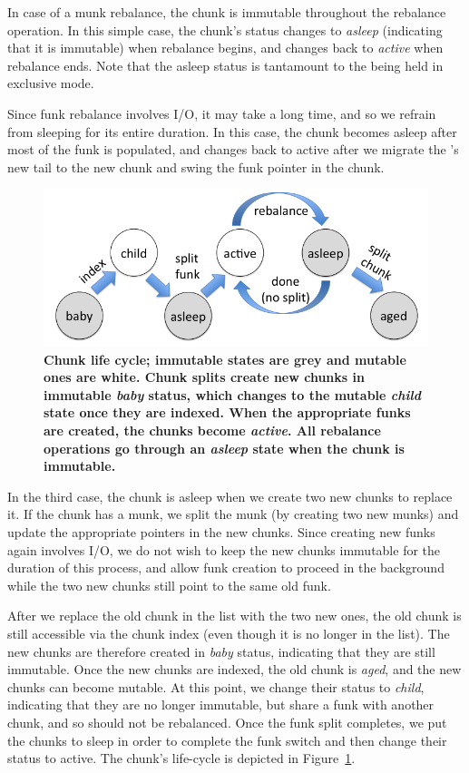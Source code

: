 In case of a munk rebalance, the chunk is immutable throughout the rebalance operation.
In this simple case, the chunk's status changes to \emph{asleep} (indicating that it is immutable)
when rebalance begins, and changes back to \emph{active} when rebalance ends. 
Note that the asleep status is tantamount to the  being held in exclusive mode.

Since funk rebalance involves I/O, it may take a long time, and so we  refrain from sleeping for its entire 
duration. In this case, the chunk becomes asleep after most of the funk is populated, and 
changes back to active after we 
migrate the 's new tail to the new chunk and swing the funk pointer in the chunk.


\begin{figure}[tb]
\centerline{
\includegraphics[width=\columnwidth]{state-diagram.png}
}
\caption{\bf{Chunk life cycle; immutable states are grey and mutable ones are white.
Chunk splits  create new chunks in immutable \emph{baby} status, which changes to the mutable \emph{child} state once they 
are indexed. When the appropriate funks are created, the chunks become \emph{active}. All rebalance operations go through an 
\emph{asleep} state when the chunk is immutable.}}
\label{fig:status}
\end{figure}

In the third case, the chunk is asleep when we create two new chunks to replace it. 
If the chunk has a munk, we split the munk (by creating two new munks) and update the appropriate pointers in the new chunks.  
Since creating new funks again involves I/O, we do not wish to keep the new chunks immutable for the duration of this process,
and allow funk creation to proceed in the background while the two new chunks still point to the same old funk. 

After we replace the old chunk in the list with the two new ones, 
the old chunk is still accessible via the chunk index (even though it is no longer in the list). 
The new chunks are therefore created in \emph{baby} status, indicating that they are still immutable. 
Once the new chunks are indexed, the old chunk is \emph{aged}, and the new chunks can become mutable.
At this point, we change their status to \emph{child}, indicating that they are no longer immutable, but share a funk with another chunk,
and so should not be rebalanced. Once the funk split completes, we put the chunks to sleep in order
to complete the funk switch and then change their  status  to active. 
The chunk's life-cycle is depicted in Figure~\ref{fig:status}.

